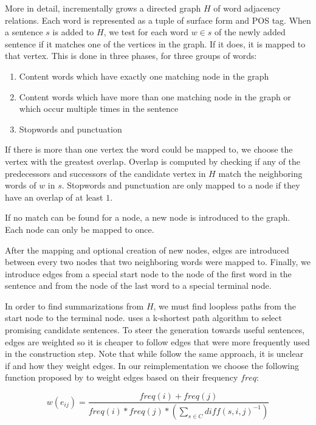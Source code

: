 \documentclass[a4paper,BCOR=10mm]{report}
\numberwithin{lemma}{chapter}
\numberwithin{definition}{chapter}
\begin{document}
More in detail, \citeauthor{filippova} incrementally grows a directed graph $H$ of word adjacency relations. Each word is represented as a tuple of surface form and POS tag. When a sentence $s$ is added to $H$, we test for each word $w \in s$ of the newly added sentence if it matches one of the vertices in the graph. If it does, it is mapped to that vertex. This is done in three phases, for three groups of words:

\begin{enumerate}
\item{Content words which have exactly one matching node in the graph}
\item{Content words which have more than one matching node in the graph or which occur multiple times in the sentence}
\item{Stopwords and punctuation} %
\end{enumerate}

If there is more than one vertex the word could be mapped to, we choose the vertex with the greatest overlap. Overlap is computed by checking if any of the predecessors and successors of the candidate vertex in $H$ match the neighboring words of $w$ in $s$.
Stopwords and punctuation are only mapped to a node if they have an overlap of at least $1$.

If no match can be found for a node, a new node is introduced to the graph. Each node can only be mapped to once.

After the mapping and optional creation of new nodes, edges are introduced between every two nodes that two neighboring words were mapped to.
Finally, we introduce edges from a special start node to the node of the first word in the sentence and from the node of the last word to a special terminal node.

In order to find summarizations from $H$, we must find loopless paths from the start node to the terminal node. \citet{filippova} uses a k-shortest path algorithm to select promising candidate sentences. To steer the generation towards useful sentences, edges are weighted so it is cheaper to follow edges that were more frequently used in the construction step. Note that while \citeauthor{banerjee} follow the same approach, it is unclear if and how they weight edges.
In our reimplementation we choose the following function proposed by \citeauthor{filippova} to weight edges based on their frequency $\mathit{freq}$:

\begin{equation}
w(e_{ij}) = \frac{\mathit{freq}(i) + \mathit{freq}(j)} {\mathit{freq}(i) * \mathit{freq}(j) * (\sum_{s \in C} \mathit{diff}(s, i, j)^{-1})}
\end{equation}
\end{document}
